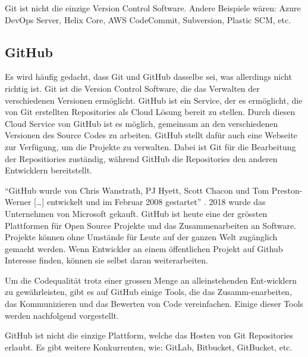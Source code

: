 Git ist nicht die einzige Version Control Software. Andere Beispiele wären:
Azure DevOps Server, Helix Core, AWS CodeCommit, Subversion, Plastic SCM, etc. 
\cite{noauthor_git_nodate-1}

\subsection*{GitHub}
Es wird häufig gedacht, dass Git und GitHub dasselbe sei, was allerdings nicht
richtig ist. Git ist die Version Control Software, die das Verwalten der
verschiedenen Versionen ermöglicht. GitHub ist ein Service, der es ermöglicht,
die von Git erstellten Repositories als Cloud Lösung bereit zu stellen. Durch
diesen Cloud Service von GitHub ist es möglich, gemeinsam an den verschiedenen
Versionen des Source Codes zu arbeiten. GitHub stellt dafür auch eine Webseite
zur Verfügung, um die Projekte zu verwalten. Dabei ist Git für die Bearbeitung
der Repositiories zuständig, während GitHub die Repositories den anderen
Entwicklern bereitstellt.
\cite{noauthor_github_2021} 

``GitHub wurde von Chris Wanstrath, PJ Hyett, Scott Chacon und Tom Preston-Werner
[\ldots] entwickelt und im Februar 2008 gestartet'' \cite{noauthor_github_2021}.
2018 wurde das Unternehmen von Microsoft gekauft. GitHub ist heute eine der
grössten Plattformen für Open Source Projekte und das Zusammenarbeiten an
Software. Projekte können ohne Umstände für Leute auf der ganzen Welt zugänglich
gemacht werden. Wenn Entwickler an einem öffentlichen Projekt auf Github
Interesse finden, können sie selbst daran weiterarbeiten. 
\cite{noauthor_github_2021}

Um die Codequalität trotz einer grossen Menge an alleinstehenden Ent\hyp{}wicklern zu
gewährleisten, gibt es auf GitHub einige Tools, die das Zusamm\hyp{}enarbeiten, das
Kommunizieren und das Bewerten von Code vereinfachen. Einige dieser Tools werden
nachfolgend vorgestellt.

GitHub ist nicht die einzige Plattform, welche das Hosten von Git Repositories
erlaubt. Es gibt weitere Konkurrenten, wie: GitLab, Bitbucket, GitBucket, etc.
\cite{noauthor_top_2021}
